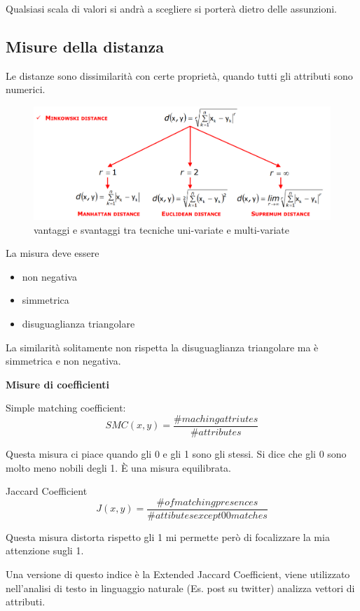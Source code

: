 Qualsiasi scala di valori si andr\`a a scegliere si porter\`a dietro delle assunzioni.

\subsection{Misure della distanza}
Le distanze sono dissimilarit\`a con certe propriet\`a, quando tutti gli attributi sono numerici.

\begin{figure}[h!]
	\centering
	\includegraphics[height=0.4 \linewidth]{clustering/pict/distanze_minkowski.png}
	\caption{vantaggi e svantaggi tra tecniche uni-variate e multi-variate}
\end{figure}

La misura deve essere
\begin{itemize}
	\item non negativa
	\item simmetrica
	\item disuguaglianza triangolare
\end{itemize}

La similarit\`a solitamente non rispetta la disuguaglianza triangolare ma \`e simmetrica e non negativa. 

\textbf{Misure di coefficienti}

Simple matching coefficient: \[ SMC(x,y) = \frac{\#maching attriutes}{\#attributes} \]

Questa misura ci piace quando gli 0 e gli 1 sono gli stessi. Si dice che gli 0 sono molto meno nobili degli 1. \`E una misura equilibrata.

Jaccard Coefficient \[ J(x,y) = \frac{\#of matching presences}{\# attibutes except 00 matches}\]

Questa misura distorta rispetto gli 1 mi permette per\`o di focalizzare la mia attenzione sugli 1. 

Una versione di questo indice \`e la Extended Jaccard Coefficient, viene utilizzato nell'analisi di testo in linguaggio naturale (Es. post su twitter) analizza vettori di attributi.


